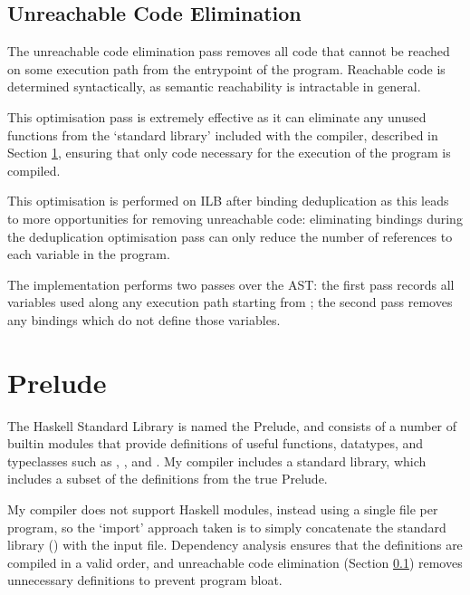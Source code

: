\documentclass[dissertation.tex]{subfiles}
\begin{document}
{    \subsection{Unreachable Code Elimination}\label{sec:unreachable-elim}
    {
        The unreachable code elimination pass removes all code that cannot be reached on some execution path from the entrypoint of the program. Reachable code is determined syntactically, as semantic reachability is intractable in general.

        This optimisation pass is extremely effective as it can eliminate any unused functions from the `standard library' included with the compiler, described in Section \ref{sec:prelude}, ensuring that only code necessary for the execution of the program is compiled.

        This optimisation is performed on ILB after binding deduplication as this leads to more opportunities for removing unreachable code: eliminating bindings during the deduplication optimisation pass can only reduce the number of references to each variable in the program.

        The implementation performs two passes over the AST: the first pass records all variables used along any execution path starting from ; the second pass removes any bindings which do not define those variables.
    }
}
\section{Prelude}\label{sec:prelude}
{
    The Haskell Standard Library is named the Prelude, and consists of a number of builtin modules that provide definitions of useful functions, datatypes, and typeclasses such as , , and . My compiler includes a standard library, which includes a subset of the definitions from the true Prelude.
    
    My compiler does not support Haskell modules, instead using a single file per program, so the `import' approach taken is to simply concatenate the standard library () with the input file. Dependency analysis ensures that the definitions are compiled in a valid order, and unreachable code elimination (Section \ref{sec:unreachable-elim}) removes unnecessary definitions to prevent program bloat.
}
\end{document}
